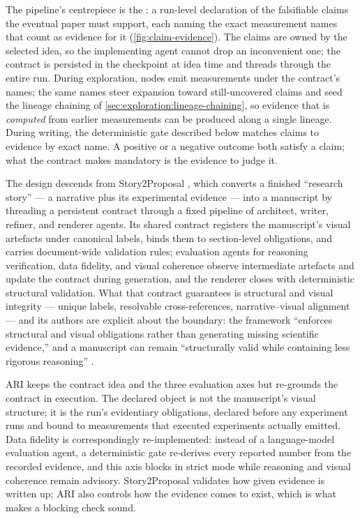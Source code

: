 The pipeline's centrepiece is the : a run-level
declaration of the falsifiable claims the eventual paper must support,
each naming the exact measurement names that count as evidence for it
(\cref{fig:claim-evidence}). The claims are owned by the selected
idea, so the implementing agent cannot drop an inconvenient one;
the contract is persisted in the checkpoint at idea time and threads
through the entire run. During exploration, nodes emit measurements
under the contract's names; the same names steer expansion toward
still-uncovered claims and seed the lineage chaining of
\cref{sec:exploration:lineage-chaining}, so evidence that is
\emph{computed} from earlier measurements can be produced along a
single lineage. During writing, the deterministic gate described
below matches claims to evidence by exact name. A positive or a
negative outcome both satisfy a claim; what the contract makes
mandatory is the evidence to judge it.

The design descends from Story2Proposal
\cite{qian2026story2proposal}, which converts a finished ``research
story'' --- a narrative plus its experimental evidence --- into a
manuscript by threading a persistent contract through a fixed
pipeline of architect, writer, refiner, and renderer agents. Its
shared contract registers the manuscript's visual artefacts under
canonical labels, binds them to section-level obligations, and
carries document-wide validation rules; evaluation agents for
reasoning verification, data fidelity, and visual coherence observe
intermediate artefacts and update the contract during generation, and
the renderer closes with deterministic structural validation. What
that contract guarantees is structural and visual integrity ---
unique labels, resolvable cross-references, narrative--visual
alignment --- and its authors are explicit about the boundary: the
framework ``enforces structural and visual obligations rather than
generating missing scientific evidence,'' and a manuscript can remain
``structurally valid while containing less rigorous reasoning''
\cite{qian2026story2proposal}.

ARI keeps the contract idea and the three evaluation axes but
re-grounds the contract in execution. The declared object is not the
manuscript's visual structure; it is the run's evidentiary
obligations, declared before any experiment runs and bound to
measurements that executed experiments actually emitted. Data
fidelity is correspondingly re-implemented: instead of a
language-model evaluation agent, a deterministic gate re-derives
every reported number from the recorded evidence, and this axis
blocks in strict mode while reasoning and visual coherence remain
advisory. Story2Proposal validates how given evidence is written up;
ARI also controls how the evidence comes to exist, which is what
makes a blocking check sound.

